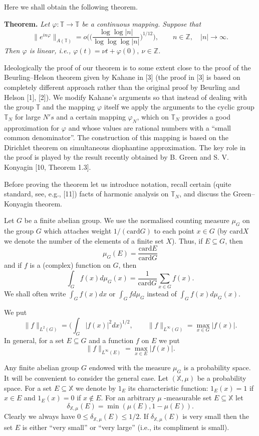 \documentclass[12pt]{article}
\begin{document}
  Here we shall obtain the following theorem.

\quad

\textbf{Theorem.} \emph{Let $\varphi: \mathbb T\rightarrow\mathbb
T$ be a continuous mapping. Suppose that
$$
\|e^{in\varphi}\|_{A(\mathbb
T)}=o\bigg(\bigg(\frac{\log\log |n|}{\log\log\log |n|}\bigg)^{1/12}\bigg),
\qquad n\in\mathbb Z, \quad |n|\rightarrow \infty.
$$
Then $\varphi$ is linear, i.e., $\varphi(t)=\nu t+\varphi(0),
~\nu\in\mathbb Z$.}

\quad

  Ideologically the proof of our theorem is to some extent close
to the proof of the Beurling--Helson theorem given by Kahane in
[3] (the proof in [3] is based on completely different approach
rather than the original proof by Beurling and Helson [1], [2]).
We modify Kahane's arguments so that instead of dealing with the
group $\mathbb T$ and the mapping $\varphi$ itself we apply the
arguments to the cyclic group $\mathbb T_N$ for large $N's$ and a
certain mapping $\varphi_N$, which on $\mathbb T_N$ provides a
good approximation for $\varphi$ and whose values are rational
numbers with a ``small common denominator''. The construction of
this mapping is based on the Dirichlet theorem on simultaneous
diophantine approximation. The key role in the proof is played by
the result recently obtained by B. Green and S. V. Konyagin [10,
Theorem 1.3].

    Before proving the theorem let us introduce notation,
recall certain (quite standard, see, e.g., [11]) facts of harmonic
analysis on $\mathbb T_N$, and discuss the Green--Konyagin
theorem.

   Let $G$ be a finite abelian group.  We
use the normalised counting measure $\mu_G$ on the group $G$ which
attaches weight $1/(\mathrm{card} G)$ to each point $x\in G$ (by
$\mathrm{card} X$ we denote the number of the elements of a finite
set $X$). Thus, if $E\subseteq G$, then
$$
\mu_G (E)=\frac{\mathrm{card} E}{\mathrm{card} G}
$$
and if $f$ is a (complex) function on $G$, then
$$
\int_G f(x)d\mu_G(x)=\frac{1}{\mathrm{card} G}\sum_{x\in G} f(x).
$$
We shall often write $\int_G f(x)dx$ or $\int_G fd\mu_G$ instead
of $\int_G f(x)d\mu_G(x)$.

  We put
$$
\|f\|_{L^2(G)}=\bigg(\int_G|f(x)|^2 dx\bigg)^{1/2}, \qquad
\|f\|_{L^\infty(G)}=\max_{x\in G}|f(x)|.
$$
In general, for a set $E\subseteq G$ and a function $f$ on $E$ we
put
$$
\|f\|_{L^\infty(E)}=\max_{x\in E}|f(x)|.
$$

   Any finite abelian group $G$ endowed with the measure $\mu_G$ is
a probability space. It will be convenient to consider the general
case. Let $(\mathbb X,\mu)$ be a probability space. For a set
$E\subseteq \mathbb X$ we denote by $1_E$ its characteristic
function: $1_E(x)=1$ if $x\in E$ and $1_E(x)=0$ if $x\notin E$.
For an arbitrary $\mu$ -measurable set $E\subseteq\mathbb X$ let
$$
\delta_{\mathbb X, \mu}(E)=\min(\mu(E), 1-\mu(E)).
$$
Clearly we always have $0\leq\delta_{\mathbb X, \mu}(E)\leq1/2$.
If $\delta_{\mathbb X, \mu}(E)$ is very small then the set $E$ is
either ``very small'' or ``very large'' (i.e., its compliment is
small).
\end{document}

